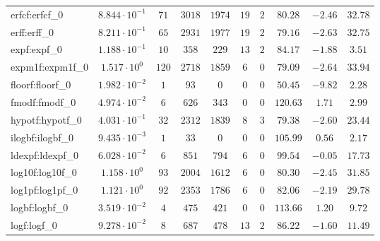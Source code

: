 \begin{tabular}{|l|c|c|c|c|c|c|c|c|c|}
erfcf:erfcf\_0               & $ 8.844 \cdot 10^{-1} $ & $ 71     $ & $ 3018  $ & $ 1974  $ & $ 19  $ & $ 2  $ & $ 80.28       $ & $ -2.46   $ & $ 32.78   $ \\
erff:erff\_0                 & $ 8.211 \cdot 10^{-1} $ & $ 65     $ & $ 2931  $ & $ 1977  $ & $ 19  $ & $ 2  $ & $ 79.16       $ & $ -2.63   $ & $ 32.75   $ \\
expf:expf\_0                 & $ 1.188 \cdot 10^{-1} $ & $ 10     $ & $ 358   $ & $ 229   $ & $ 13  $ & $ 2  $ & $ 84.17       $ & $ -1.88   $ & $ 3.51    $ \\
expm1f:expm1f\_0             & $ 1.517 \cdot 10^{0}  $ & $ 120    $ & $ 2718  $ & $ 1859  $ & $ 6   $ & $ 0  $ & $ 79.09       $ & $ -2.64   $ & $ 33.94   $ \\
floorf:floorf\_0             & $ 1.982 \cdot 10^{-2} $ & $ 1      $ & $ 93    $ & $ 0     $ & $ 0   $ & $ 0  $ & $ 50.45       $ & $ -9.82   $ & $ 2.28    $ \\
fmodf:fmodf\_0               & $ 4.974 \cdot 10^{-2} $ & $ 6      $ & $ 626   $ & $ 343   $ & $ 0   $ & $ 0  $ & $ 120.63      $ & $ 1.71    $ & $ 2.99    $ \\
hypotf:hypotf\_0             & $ 4.031 \cdot 10^{-1} $ & $ 32     $ & $ 2312  $ & $ 1839  $ & $ 8   $ & $ 3  $ & $ 79.38       $ & $ -2.60   $ & $ 23.44   $ \\
ilogbf:ilogbf\_0             & $ 9.435 \cdot 10^{-3} $ & $ 1      $ & $ 33    $ & $ 0     $ & $ 0   $ & $ 0  $ & $ 105.99      $ & $ 0.56    $ & $ 2.17    $ \\
ldexpf:ldexpf\_0             & $ 6.028 \cdot 10^{-2} $ & $ 6      $ & $ 851   $ & $ 794   $ & $ 6   $ & $ 0  $ & $ 99.54       $ & $ -0.05   $ & $ 17.73   $ \\
log10f:log10f\_0             & $ 1.158 \cdot 10^{0}  $ & $ 93     $ & $ 2004  $ & $ 1612  $ & $ 6   $ & $ 0  $ & $ 80.30       $ & $ -2.45   $ & $ 31.85   $ \\
log1pf:log1pf\_0             & $ 1.121 \cdot 10^{0}  $ & $ 92     $ & $ 2353  $ & $ 1786  $ & $ 6   $ & $ 0  $ & $ 82.06       $ & $ -2.19   $ & $ 29.78   $ \\
logbf:logbf\_0               & $ 3.519 \cdot 10^{-2} $ & $ 4      $ & $ 475   $ & $ 421   $ & $ 0   $ & $ 0  $ & $ 113.66      $ & $ 1.20    $ & $ 9.72    $ \\
logf:logf\_0                 & $ 9.278 \cdot 10^{-2} $ & $ 8      $ & $ 687   $ & $ 478   $ & $ 13  $ & $ 2  $ & $ 86.22       $ & $ -1.60   $ & $ 11.49   $ \\

\end{tabular}
